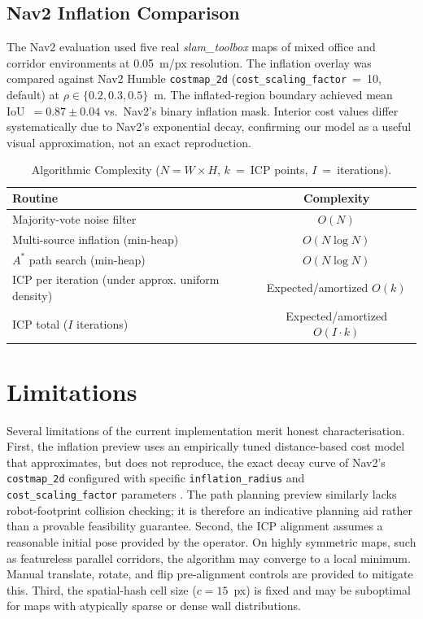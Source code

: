 \documentclass[journal]{IEEEtran}
\begin{document}
\subsection{Nav2 Inflation Comparison}
The Nav2 evaluation used five real \emph{slam\_toolbox} maps of mixed office and corridor environments at 0.05~m/px resolution. The inflation overlay was compared against Nav2 Humble \texttt{costmap\_2d} (\texttt{cost\_scaling\_factor}~=~10, default) at $\rho \in \{0.2,0.3,0.5\}$~m. The inflated-region boundary achieved mean IoU~$=0.87\pm0.04$ vs.\ Nav2's binary inflation mask. Interior cost values differ systematically due to Nav2's exponential decay, confirming our model as a useful visual approximation, not an exact reproduction.

\begin{table}[t]
\centering
\caption{Algorithmic Complexity ($N=W\!\times\!H$, $k$~=~ICP points, $I$~=~iterations).}
\label{tab:complexity}
\scriptsize
\renewcommand{\arraystretch}{1.0}
\begin{tabular}{@{}lc@{}}
\toprule
\textbf{Routine} & \textbf{Complexity} \\
\midrule
Majority-vote noise filter         & $O(N)$ \\
Multi-source inflation (min-heap)  & $O(N\log N)$ \\
$A^{*}$ path search (min-heap)     & $O(N\log N)$ \\
ICP per iteration (under approx. uniform density) & Expected/amortized $O(k)$ \\
ICP total ($I$ iterations)         & Expected/amortized $O(I\cdot k)$ \\
\bottomrule
\end{tabular}
\vspace{-2mm}
\end{table}

\section{Limitations}
\label{sec:limitations}
Several limitations of the current implementation merit honest characterisation. First, the inflation preview uses an empirically tuned distance-based cost model that approximates, but does not reproduce, the exact decay curve of Nav2's \texttt{costmap\_2d} configured with specific \texttt{inflation\_radius} and \texttt{cost\_scaling\_factor} parameters \cite{nav2docs}. The path planning preview similarly lacks robot-footprint collision checking; it is therefore an indicative planning aid rather than a provable feasibility guarantee. Second, the ICP alignment assumes a reasonable initial pose provided by the operator. On highly symmetric maps, such as featureless parallel corridors, the algorithm may converge to a local minimum. Manual translate, rotate, and flip pre-alignment controls are provided to mitigate this. Third, the spatial-hash cell size ($c=15$~px) is fixed and may be suboptimal for maps with atypically sparse or dense wall distributions.
\end{document}
